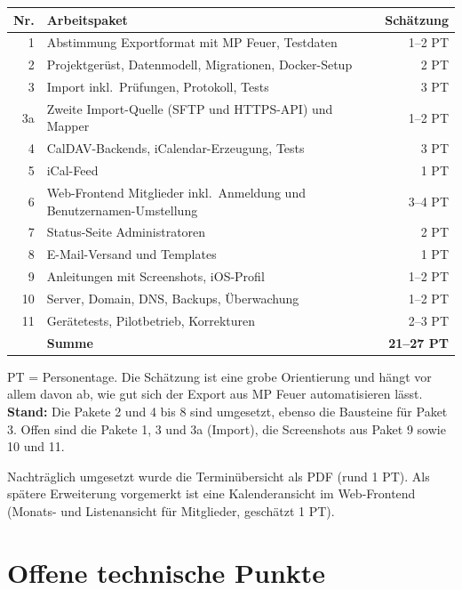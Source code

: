 \begin{center}
\begin{tabularx}{\textwidth}{rXr}
\toprule
\textbf{Nr.} & \textbf{Arbeitspaket} & \textbf{Schätzung} \\
\midrule
1 & Abstimmung Exportformat mit MP Feuer, Testdaten & 1--2 PT \\
2 & Projektgerüst, Datenmodell, Migrationen, Docker-Setup & 2 PT \\
3 & Import inkl.\ Prüfungen, Protokoll, Tests & 3 PT \\
3a & Zweite Import-Quelle (SFTP und HTTPS-API) und Mapper & 1--2 PT \\
4 & CalDAV-Backends, iCalendar-Erzeugung, Tests & 3 PT \\
5 & iCal-Feed & 1 PT \\
6 & Web-Frontend Mitglieder inkl.\ Anmeldung und
    Benutzernamen-Umstellung & 3--4 PT \\
7 & Status-Seite Administratoren & 2 PT \\
8 & E-Mail-Versand und Templates & 1 PT \\
9 & Anleitungen mit Screenshots, iOS-Profil & 1--2 PT \\
10 & Server, Domain, DNS, Backups, Überwachung & 1--2 PT \\
11 & Gerätetests, Pilotbetrieb, Korrekturen & 2--3 PT \\
\midrule
 & \textbf{Summe} & \textbf{21--27 PT} \\
\bottomrule
\end{tabularx}
\end{center}

PT = Personentage. Die Schätzung ist eine grobe Orientierung und hängt vor
allem davon ab, wie gut sich der Export aus MP Feuer automatisieren lässt.
\textbf{Stand:} Die Pakete 2 und 4 bis 8 sind umgesetzt, ebenso die
Bausteine für Paket 3. Offen sind die Pakete 1, 3 und 3a (Import), die
Screenshots aus Paket 9 sowie 10 und 11.

Nachträglich umgesetzt wurde die Terminübersicht als PDF (rund 1 PT). Als
spätere Erweiterung vorgemerkt ist eine Kalenderansicht im Web-Frontend
(Monats- und Listenansicht für Mitglieder, geschätzt 1 PT).

\section{Offene technische Punkte}

